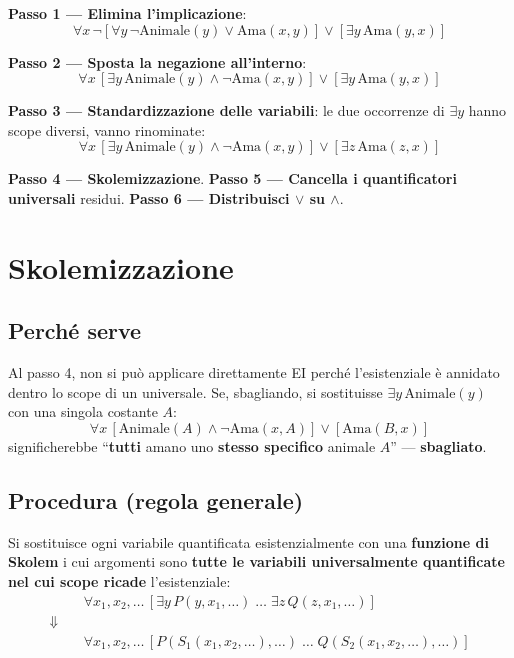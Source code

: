 \documentclass[11pt,a4paper]{report}
\begin{document}
\textbf{Passo 1 --- Elimina l'implicazione}:
\[
\forall x\, \neg[\forall y\, \neg\text{Animale}(y) \vee \text{Ama}(x,y)] \vee [\exists y\, \text{Ama}(y,x)]
\]

\textbf{Passo 2 --- Sposta la negazione all'interno}:
\[
\forall x\, [\exists y\, \text{Animale}(y) \wedge \neg\text{Ama}(x,y)] \vee [\exists y\, \text{Ama}(y,x)]
\]

\textbf{Passo 3 --- Standardizzazione delle variabili}: le due occorrenze di $\exists y$ hanno scope diversi, vanno rinominate:
\[
\forall x\, [\exists y\, \text{Animale}(y) \wedge \neg\text{Ama}(x,y)] \vee [\exists z\, \text{Ama}(z,x)]
\]

\textbf{Passo 4 --- Skolemizzazione}. \textbf{Passo 5 --- Cancella i quantificatori universali} residui. \textbf{Passo 6 --- Distribuisci $\vee$ su $\wedge$}.

\section{Skolemizzazione}

\subsection*{Perché serve}

Al passo 4, non si può applicare direttamente EI perché l'esistenziale è annidato dentro lo scope di un universale. Se, sbagliando, si sostituisse $\exists y\,\text{Animale}(y)$ con una singola costante $A$:
\[
\forall x\, [\text{Animale}(A) \wedge \neg\text{Ama}(x,A)] \vee [\text{Ama}(B,x)]
\]
significherebbe ``\textbf{tutti} amano uno \textbf{stesso specifico} animale $A$'' --- \textbf{sbagliato}.

\subsection*{Procedura (regola generale)}

Si sostituisce ogni variabile quantificata esistenzialmente con una \textbf{funzione di Skolem} i cui argomenti sono \textbf{tutte le variabili universalmente quantificate nel cui scope ricade} l'esistenziale:
\begin{align*}
&\forall x_1,x_2,\dots\, [\exists y\, P(y,x_1,\dots) \;\dots\; \exists z\, Q(z,x_1,\dots)] \\
\Downarrow \quad & \\
&\forall x_1,x_2,\dots\, [P(S_1(x_1,x_2,\dots),\dots) \;\dots\; Q(S_2(x_1,x_2,\dots),\dots)]
\end{align*}
\end{document}
